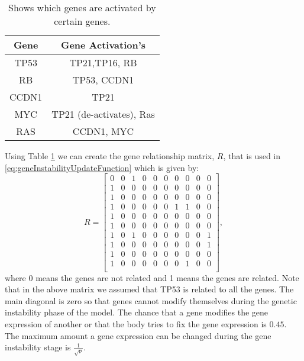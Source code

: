 \documentclass[\main/thesis.tex]{subfiles}
\begin{document}
\begin{table}
	\centering
	\begin{tabular}{| c c |}
		\hline
		Gene & Gene Activation's \\
		\hline\hline
		TP53 & TP21,TP16, RB \\
		\hline
		RB & TP53, CCDN1 \\
		\hline
		CCDN1 & TP21 \\
		\hline
		MYC & TP21 (de-activates), Ras \\
		\hline
		RAS & CCDN1, MYC \\
		\hline
	\end{tabular}
	\caption{Shows which genes are activated by certain genes.}
	\label{table:geneRelations}
\end{table}
Using Table \ref{table:geneRelations} we can create the gene relationship matrix, $R$, that is used in \eqref{eq:geneInstabilityUpdateFunction} which is given by:
\begin{equation}
    R {=}
    \begin{bmatrix}
        0 & 0 & 1 & 0 & 0 & 0 & 0 & 0 & 0 & 0 \\
        1 & 0 & 0 & 0 & 0 & 0 & 0 & 0 & 0 & 0 \\
        1 & 0 & 0 & 0 & 0 & 0 & 0 & 0 & 0 & 0 \\
        1 & 0 & 0 & 0 & 0 & 0 & 1 & 1 & 0 & 0 \\
        1 & 0 & 0 & 0 & 0 & 0 & 0 & 0 & 0 & 0 \\
        1 & 0 & 0 & 0 & 0 & 0 & 0 & 0 & 0 & 0 \\
        1 & 0 & 1 & 0 & 0 & 0 & 0 & 0 & 0 & 1 \\
        1 & 0 & 0 & 0 & 0 & 0 & 0 & 0 & 0 & 1 \\
        1 & 0 & 0 & 0 & 0 & 0 & 0 & 0 & 0 & 0 \\
        1 & 0 & 0 & 0 & 0 & 0 & 0 & 1 & 0 & 0 \\
    \end{bmatrix},
    \label{param:R}
\end{equation}
where 0 means the genes are not related and 1 means the genes are related.
Note that in the above matrix we assumed that TP53 is related to all the genes. The main diagonal is zero so that genes cannot modify themselves during the genetic instability phase of the model. %
The chance that a gene modifies the gene expression of another or that the body tries to fix the gene expression is $0.45$. The maximum amount a gene expression can be changed during the gene instability stage is $\frac{1}{\sqrt{\nu}}$.
\end{document}
